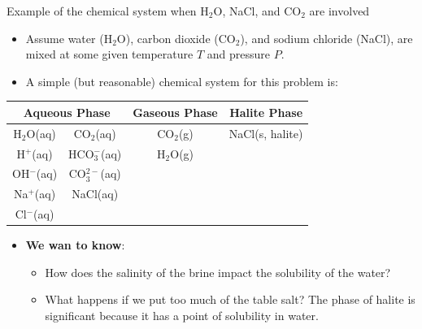 \begin{frame}{Example of the chemical system when H$_{2}$O, NaCl, and CO$_{2}$
are involved}
\begin{itemize}
\item Assume water (H$_{2}$O), carbon dioxide (CO$_{2}$), and sodium chloride
(NaCl), are mixed at some given temperature $T$ and pressure $P$. 
\item A simple (but reasonable) chemical system for this problem is:
\end{itemize}
\begin{center}
\begin{tabular}{cccc}
\toprule 
\multicolumn{2}{c}{\textbf{Aqueous Phase}} & \multicolumn{1}{c}{\textbf{Gaseous Phase}} & \textbf{Halite Phase}\tabularnewline
\midrule
H$_{2}$O(aq) & CO$_{2}$(aq) & CO$_{2}$(g) & NaCl(s, halite)\tabularnewline
H$^{+}$(aq) & HCO$_{3}^{-}$(aq) & H$_{2}$O(g) & \tabularnewline
OH$^{-}$(aq) & CO$_{3}^{2-}$(aq) &  & \tabularnewline
Na$^{+}$(aq) &  NaCl(aq) &  & \tabularnewline
Cl$^{-}$(aq) &  &  & \tabularnewline
\bottomrule
\end{tabular}
\par\end{center}

\begin{itemize}
\item \alert{\textbf{We wan to know}}: 
\begin{itemize}
\item How does the salinity of the brine impact the solubility of the water? 
\item What happens if we put too much of the table salt? The phase of halite is significant
 because it has a point of solubility in water. 
\end{itemize}
\end{itemize}


\end{frame}
%
%
